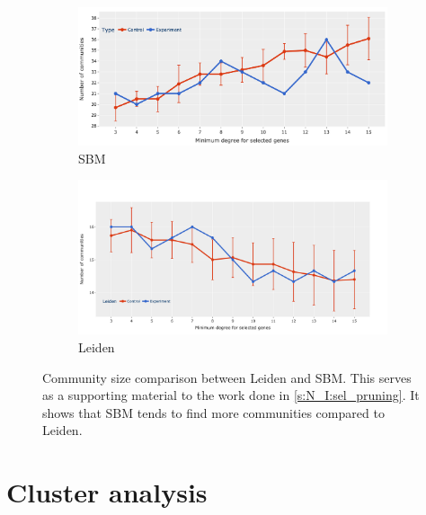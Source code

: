 \begin{figure}[!h]
    \centering
    \begin{subfigure}[!t]{1.0\textwidth}
        \includegraphics[width=\textwidth]{Sections/Network_I/Resources/selective_pruning/com_comp/sbm_comNum_sel_prun.png}
        \caption{SBM}
        \label{fig:ap:sbm_com_size}
    \end{subfigure} 
    \begin{subfigure}[!t]{1.0\textwidth}
        \includegraphics[width=\linewidth]{Sections/Network_I/Resources/selective_pruning/leid_comNum_sel_prun.png}
        \caption{Leiden}
        \label{fig:ap:leid_com_size}
    \end{subfigure}\hspace{\fill}  
    \caption[Leiden vs SBM: community size comparison]{Community size comparison between Leiden and SBM. This serves as a supporting material to the work done in \cref{s:N_I:sel_pruning}. It shows that SBM tends to find more communities compared to Leiden.}
    \label{fig:ap:com_size_comp}
\end{figure}

\section{Cluster analysis} \label{s:ap:sel_tfs_cs}

